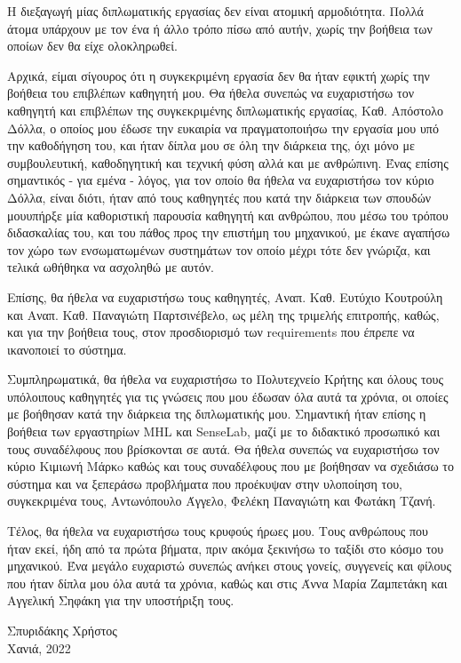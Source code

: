 \begin{acknowledgements}
	\renewcommand\acknowledgementname{Ευχαριστίες}
	\addchaptertocentry{\acknowledgementname} %
	
	Η διεξαγωγή μίας διπλωματικής εργασίας δεν είναι ατομική αρμοδιότητα. Πολλά άτομα υπάρχουν με τον ένα ή άλλο τρόπο πίσω από αυτήν, χωρίς την βοήθεια των οποίων δεν θα είχε ολοκληρωθεί.

	Αρχικά, είμαι σίγουρος ότι η συγκεκριμένη εργασία δεν θα ήταν εφικτή χωρίς την βοήθεια του επιβλέπων καθηγητή μου. Θα ήθελα συνεπώς να ευχαριστήσω τον καθηγητή και επιβλέπων της συγκεκριμένης διπλωματικής εργασίας, Καθ. Α\-πό\-στο\-λο Δόλλα, ο οποίος μου έδωσε την ευκαιρία να πραγματοποιήσω την εργασία μου υπό την καθοδήγηση του, και ήταν δίπλα μου σε όλη την διάρκεια της, όχι μόνο με συμβουλευτική, καθοδηγητική και τεχνική φύση αλλά και με ανθρώπινη. Ένας επίσης σημαντικός - για εμένα - λόγος, για τον οποίο θα ήθελα να ευχαριστήσω τον κύριο Δόλλα, είναι διότι, ήταν από τους καθηγητές που κατά την διάρκεια των σπουδών μου\udot υπήρξε μία καθοριστική παρουσία καθηγητή και ανθρώπου, που μέσω του τρόπου διδασκαλίας του, και του πάθος προς την επιστήμη του μηχανικού, με έκανε αγαπήσω τον χώρο των ενσωματωμένων συστημάτων τον οποίο μέχρι τότε δεν γνώριζα, και τελικά ωθήθηκα να ασχοληθώ με αυτόν.

	Επίσης, θα ήθελα να ευχαριστήσω τους καθηγητές, Αναπ. Καθ. Ευτύχιο Κουτρούλη και Αναπ. Καθ. Παναγιώτη Παρτσινέβελο, ως μέλη της τριμελής επιτροπής, καθώς, και για την βοήθεια τους, στον προσδιορισμό των requirements που έπρεπε να ικανοποιεί το σύστημα.  

	Συμπληρωματικά, θα ήθελα να ευχαριστήσω το Πολυτεχνείο Κρήτης και όλους τους υπόλοιπους καθηγητές για τις γνώσεις που μου έδωσαν όλα αυτά τα χρόνια, οι οποίες με βοήθησαν κατά την διάρκεια της διπλωματικής μου. Σημαντική ήταν επίσης η βοήθεια των εργαστηρίων MHL και SenseLab, μαζί με το διδακτικό προσωπικό και τους συναδέλφους που βρίσκονται σε αυτά. Θα ήθελα συνεπώς να ευχαριστήσω τον κύριο Κιμιωνή Μάρκo καθώς και τους συναδέλφους που με βοήθησαν να σχεδιάσω το σύστημα και να ξεπεράσω προβλήματα που προέκυψαν στην υλοποίηση του, συ\-γκε\-κρι\-μέ\-να τους, Αντωνόπουλο Άγγελο, Φελέκη Παναγιώτη και Φωτάκη Τζανή. 

	Τέλος, θα ήθελα να ευχαριστήσω τους κρυφούς ήρωες μου. Τους ανθρώπους που ήταν εκεί, ήδη από τα πρώτα βήματα, πριν ακόμα ξεκινήσω το ταξίδι στο κόσμο του μηχανικού. Ένα μεγάλο ευχαριστώ συνεπώς ανήκει στους γονείς, συγγενείς και φίλους που ήταν δίπλα μου όλα αυτά τα χρόνια, καθώς και στις Άννα Μαρία Ζα\-μπε\-τά\-κη και Αγγελική Σηφάκη για την υποστήριξη τους. 

	\begin{flushright}Σπυριδάκης Χρήστος\\ Χανιά, 2022\end{flushright}
\end{acknowledgements}
